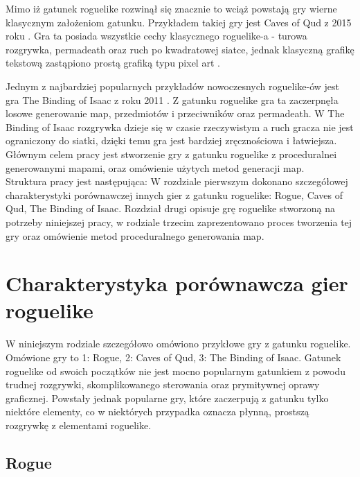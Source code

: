 \documentclass[12pt,twoside]{article}
\begin{document}
Mimo iż gatunek roguelike rozwinął się znacznie to wciąż powstają gry wierne klasycznym założeniom gatunku. Przykładem takiej gry jest Caves of Qud z 2015 roku \cite{game_coq}. Gra ta posiada wszystkie cechy klasycznego roguelike-a - turowa rozgrywka, permadeath oraz ruch po kwadratowej siatce, jednak klasyczną grafikę tekstową zastąpiono prostą grafiką typu pixel art \cite{source_pixelart}.

Jednym z najbardziej popularnych przykładów nowoczesnych roguelike-ów jest gra The Binding of Isaac z roku 2011 \cite{game_tboi}. Z gatunku roguelike gra ta zaczerpnęła losowe generowanie map, przedmiotów i przeciwników oraz permadeath. W The Binding of Isaac rozgrywka dzieje się w czasie rzeczywistym a ruch gracza nie jest ograniczony do siatki, dzięki temu gra jest bardziej zręcznościowa i łatwiejsza.\\

Głównym celem pracy jest stworzenie gry z gatunku roguelike z proceduralnei generowanymi mapami, oraz omówienie użytych metod generacji map. \\

Struktura pracy jest następująca: W rozdziale pierwszym dokonano szczegółowej charakterystyki porównawczej innych gier z gatunku roguelike: Rogue, Caves of Qud, The Binding of Isaac. Rozdział drugi opisuje grę roguelike stworzoną na potrzeby niniejszej pracy, w rodziale trzecim zaprezentowano proces tworzenia tej gry oraz omówienie metod proceduralnego generowania map.


\clearpage

\section{Charakterystyka porównawcza gier roguelike}

W niniejszym rodziale szczegółowo omówiono przykłowe gry z gatunku roguelike. Omówione gry to 1: Rogue, 2: Caves of Qud, 3: The Binding of Isaac. Gatunek roguelike od swoich początków nie jest mocno popularnym gatunkiem z powodu trudnej rozgrywki, skomplikowanego sterowania oraz prymitywnej oprawy graficznej. Powstały jednak popularne gry, które zaczerpują z gatunku tylko niektóre elementy, co w niektórych przypadka oznacza płynną, prostszą rozgrywkę z elementami roguelike.

\subsection{Rogue}
\end{document}
